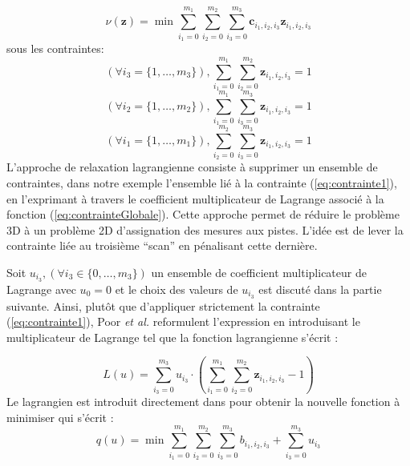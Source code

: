 \documentclass[10pt,french,a4paper]{report}
\begin{document}
  	 	   \begin{equation}  
  	 	   \label{eq:contrainteGlobale}
\nu(\mathbf{z}) = \min\sum_{i_1=0}^{m_1}\sum_{i_2=0}^{m_2}\sum_{i_3=0}^{m_3}\mathbf{c}_{i_1,i_2,i_3}\mathbf{z}_{i_{1},i_{2},i_{3}}
 	    \end{equation}
sous les contraintes: 	    
 	 	   \begin{equation}  
 	 	   \label{eq:contrainte1}
(\forall i_3 = \{1,\ldots,m_3\}), \sum_{i_1=0}^{m_1}\sum_{i_2=0}^{m_2}\mathbf{z}_{i_{1},i_{2},i_{3}} = 1 
 	    \end{equation}
        \begin{equation}  
        \label{eq:contrainte2}
(\forall i_2 = \{1,\ldots,m_2\}), \sum_{i_1=0}^{m_1}\sum_{i_3=0}^{m_3}\mathbf{z}_{i_{1},i_{2},i_{3}} = 1 
 	    \end{equation}
 	    \begin{equation} 
 	    \label{eq:contrainte3} 
(\forall i_1 = \{1,\ldots,m_1\}), \sum_{i_2=0}^{m_2}\sum_{i_3=0}^{m_3}\mathbf{z}_{i_{1},i_{2},i_{3}} = 1 
 	    \end{equation}
L'approche de relaxation lagrangienne consiste à supprimer un ensemble de contraintes, dans notre exemple
l'ensemble lié à la contrainte (\ref{eq:contrainte1}), en l'exprimant à travers le coefficient multiplicateur de Lagrange associé à la
fonction (\ref{eq:contrainteGlobale}). Cette approche permet de réduire le problème 3D à un problème 2D d'assignation des mesures
aux pistes. L'idée est de lever la contrainte liée au troisième ``scan'' en pénalisant cette dernière.
 	    
 	    Soit $u_{i_3},(\forall i_3 \in \{0,\ldots,m_3\})$ un ensemble de coefficient multiplicateur de Lagrange avec $u_0=0$ et le choix des
valeurs de $u_{i_3}$ est discuté dans la partie suivante. Ainsi, plutôt que d'appliquer strictement la contrainte
(\ref{eq:contrainte1}), Poor \textit{et al.} \cite{Poore1995} reformulent l'expression en introduisant le multiplicateur de Lagrange tel que la fonction lagrangienne s'écrit :


 	 	   \begin{equation}  
 	 	   \label{eq:contrainteGlob2}
L(u) =   \sum_{i_3=0}^{m_3} u_{i_3} \cdot (\sum_{i_1=0}^{m_1}\sum_{i_2=0}^{m_2} \mathbf{z}_{i_{1},i_{2},i_{3}} -1 )
 	    \end{equation}
Le lagrangien est introduit directement dans pour obtenir la nouvelle fonction à minimiser qui s'écrit :
 \begin{equation}  
\label{eq:mincostfunction}
q(u) =  \min  \sum_{i_1=0}^{m_1}\sum_{i_2=0}^{m_2}\sum_{i_3=0}^{m_3}  b_{i_{1},i_{2},i_{3}}    + \sum_{i_3=0}^{m_3} u_{i_3}   
 \end{equation}
 
\end{document}
